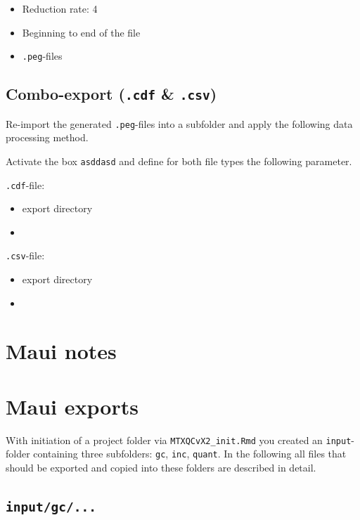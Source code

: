 \documentclass[]{book}
\providecommand{\tightlist}{%
  \setlength{\itemsep}{0pt}\setlength{\parskip}{0pt}}
\begin{document}
\begin{itemize}
\tightlist
\item
  Reduction rate: 4
\item
  Beginning to end of the file
\item
  \texttt{.peg}-files
\end{itemize}

\subsection{\texorpdfstring{Combo-export (\texttt{.cdf} \&
\texttt{.csv})}{Combo-export (.cdf \& .csv)}}\label{combo-export-.cdf-.csv}

Re-import the generated \texttt{.peg}-files into a subfolder and apply
the following data processing method.

Activate the box \texttt{asddasd} and define for both file types the
following parameter.

\texttt{.cdf}-file:

\begin{itemize}
\item
  export directory
\item
\end{itemize}

\texttt{.csv}-file:

\begin{itemize}
\item
  export directory
\item
\end{itemize}

\section{Maui notes}\label{maui-notes}

\section{Maui exports}\label{mauiexport}

With initiation of a project folder via \texttt{MTXQCvX2\_init.Rmd} you
created an \texttt{input}-folder containing three subfolders:
\texttt{gc}, \texttt{inc}, \texttt{quant}. In the following all files
that should be exported and copied into these folders are described in
detail.

\subsection{\texorpdfstring{\texttt{input/gc/...}}{input/gc/...}}\label{inputgc...}
\end{document}

